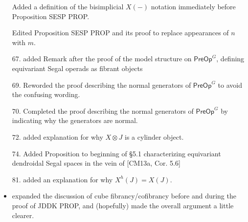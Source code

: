 \documentclass{article}
\begin{document}
\begin{itemize}
Added a definition of the bisimplicial $X(-)$ notation immediately before Proposition SESP PROP.

Edited Proposition SESP PROP and its proof to replace appearances of $n$ with $m$.

\item[67.] added Remark after the proof of the model structure on $\mathsf{PreOp}^G$, defining equivariant Segal operads as fibrant objects

\item[69.] Reworded the proof describing the normal generators of $\mathsf{PreOp}^G$ to avoid the confusing wording.

\item[70.] Completed the proof describing the normal generators of $\mathsf{PreOp}^G$ by indicating why the generators are normal.

\item[72.] added explanation for why $X \otimes J$ is a cylinder object.

\item[74.] Added Proposition to beginning of \S 5.1 characterizing equivariant dendroidal Segal spaces in the vein of [CM13a, Cor. 5.6]

\item[81.] added an explanation for why $X^h(J) = X(J)$.


\item expanded the discussion of cube fibrancy/cofibrancy before and during the proof of JDDK PROP, and (hopefully) made the overall argument a little clearer.


\end{itemize}
\end{document}
